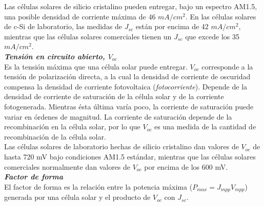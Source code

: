 \documentclass[12pt]{article}
\begin{document}
	\noindent Las células solares de silicio cristalino pueden entregar, bajo un espectro AM1.5, una posible densidad de corriente máxima de 46 $mA/cm^2$. En las células solares de c-Si de laboratorio, las medidas de $J_{sc}$ están por encima de 42 $mA/cm^2$, mientras que las células solares comerciales tienen un $J_{sc}$ que excede los 35 $mA/cm^2$. \\
	
	\noindent \textit{\textbf{Tensión en circuito abierto, $V_{oc}$}} \\
	
	\noindent Es la tensión máxima que una célula solar puede entregar. $V_{oc}$ corresponde a la tensión de polarización directa, a la cual la densidad de corriente de oscuridad compensa la densidad de corriente fotovoltaica (\textit{fotocorriente}). Depende de la densidad de corriente de saturación de la célula solar y de la corriente fotogenerada. Mientras ésta última varía poco, la corriente de saturación puede variar en órdenes de magnitud. La corriente de saturación depende de la recombinación en la célula solar, por lo que $V_{oc}$ es una medida de la cantidad de recombinación de la célula solar.\\
	
	\noindent Las células solares de laboratorio hechas de silicio cristalino dan valores de $V_{oc}$ de hasta 720 mV bajo condiciones AM1.5 estándar, mientras que las células solares comerciales normalmente dan valores de $V_{oc}$ por encima de los 600 mV. \\
	
	\noindent \textit{\textbf{Factor de forma}} \\
	
	\noindent El factor de forma es la relación entre la potencia máxima ($P_{max} = J_{mpp} V_{mpp}$) generada por una célula solar y el producto de $V_{oc}$ con $J_{sc}$. \\
	
\end{document}
